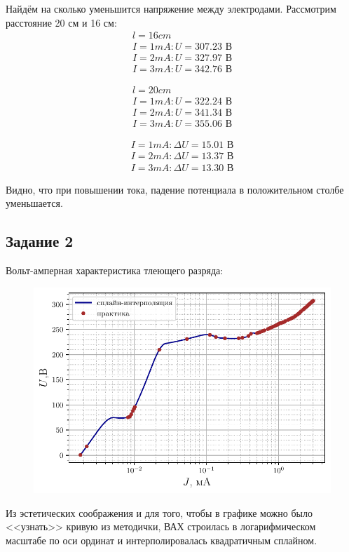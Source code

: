 Найдём на сколько уменьшится напряжение между электродами. Рассмотрим 
расстояние 20 см и 16 см:
\begin{gather*}
	l = 16 cm \\
	I = 1 mA: U = 307.23 \text{ В}\\
	I = 2 mA: U = 327.97 \text{ В}\\
	I = 3 mA: U = 342.76 \text{ В}
\end{gather*}

\begin{gather*}
	l = 20 cm \\
	I = 1 mA: U = 322.24 \text{ В} \\
	I = 2 mA: U = 341.34  \text{ В}\\
	I = 3 mA: U = 355.06 \text{ В}
\end{gather*}

\begin{gather*}
    I = 1 mA: \Delta U = 15.01 \text{ В} \\
	I = 2 mA: \Delta U = 13.37 \text{ В} \\
	I = 3 mA: \Delta U = 13.30 \text{ В}
\end{gather*}

Видно, что при повышении тока, падение потенциала в положительном 
столбе уменьшается.

\subsection{Задание 2}
Вольт-амперная характеристика тлеющего разряда:
\begin{figure}[H]
	\centering
    \includegraphics[width=0.75\linewidth]{scripts/fig2}
	\caption{}
	\label{fig:6}
\end{figure}

Из эстетических соображения и для того, чтобы в графике можно было <<узнать>> кривую из 
методички, 
ВАХ строилась в логарифмическом масштабе по оси ординат и интерполировалась
квадратичным сплайном.



